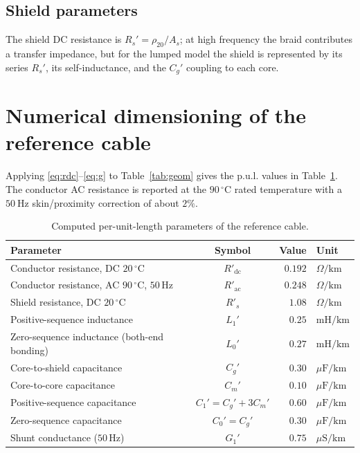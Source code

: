 \documentclass[11pt,a4paper,oneside]{book}
\begin{document}
\begin{onehalfspace}
\begin{appendices}
\subsection{Shield parameters}
The shield DC resistance is $R_s'=\rho_{20}/A_s$; at high frequency the braid
contributes a transfer impedance, but for the lumped model the shield is
represented by its series $R_s'$, its self-inductance, and the $C_g'$ coupling to
each core.

\section{Numerical dimensioning of the reference cable}\label{sec:numbers}
Applying \eqref{eq:rdc}--\eqref{eq:g} to Table~\ref{tab:geom} gives the p.u.l.
values in Table~\ref{tab:pul}. The conductor AC resistance is reported at the
$90\,^\circ\mathrm{C}$ rated temperature with a $50\ \mathrm{Hz}$ skin/proximity
correction of about $2\%$.

\begin{table}[h]
	\centering
	\caption{Computed per-unit-length parameters of the reference cable.}
	\label{tab:pul}
	\begin{tabular}{@{}lcrl@{}}
		\toprule
		Parameter & Symbol & Value & Unit \\
		\midrule
		Conductor resistance, DC $20\,^\circ\mathrm{C}$ & $R'_{\mathrm{dc}}$ & $0.192$ & $\Omega/\mathrm{km}$ \\
		Conductor resistance, AC $90\,^\circ\mathrm{C}$, $50\,\mathrm{Hz}$ & $R'_{\mathrm{ac}}$ & $0.248$ & $\Omega/\mathrm{km}$ \\
		Shield resistance, DC $20\,^\circ\mathrm{C}$ & $R'_{s}$ & $1.08$ & $\Omega/\mathrm{km}$ \\
		Positive-sequence inductance & $L_1'$ & $0.25$ & $\mathrm{mH/km}$ \\
		Zero-sequence inductance (both-end bonding) & $L_0'$ & $0.27$ & $\mathrm{mH/km}$ \\
		Core-to-shield capacitance & $C_g'$ & $0.30$ & $\mu\mathrm{F/km}$ \\
		Core-to-core capacitance & $C_m'$ & $0.10$ & $\mu\mathrm{F/km}$ \\
		Positive-sequence capacitance & $C_1'=C_g'+3C_m'$ & $0.60$ & $\mu\mathrm{F/km}$ \\
		Zero-sequence capacitance & $C_0'=C_g'$ & $0.30$ & $\mu\mathrm{F/km}$ \\
		Shunt conductance ($50\,\mathrm{Hz}$) & $G_1'$ & $0.75$ & $\mu\mathrm{S/km}$ \\
		\bottomrule
	\end{tabular}
\end{table}


\end{appendices}
\end{onehalfspace}
\end{document}

